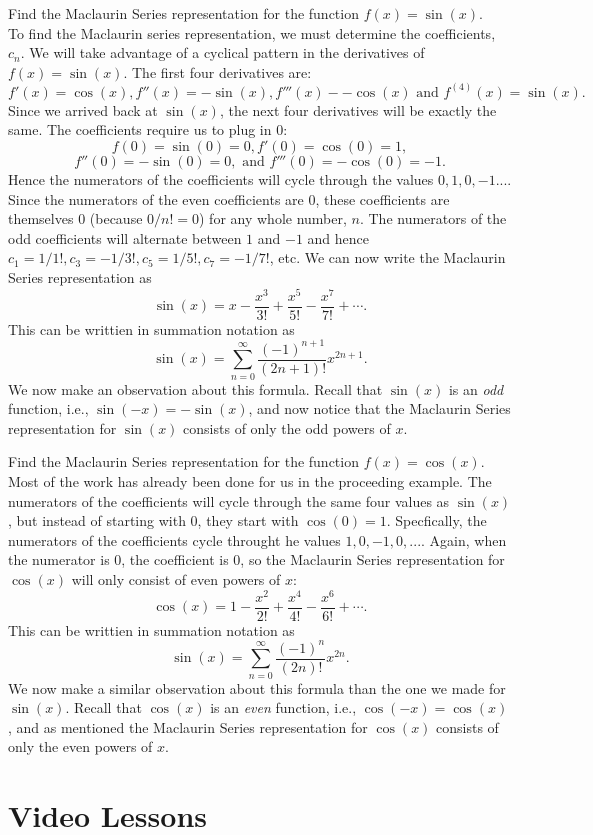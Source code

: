 \documentclass{ximera}
\begin{document}
\begin{example} Find the Maclaurin Series representation for the function $f(x) = \sin(x)$.\\
To find the Maclaurin series representation, we must determine the coefficients, $c_n$. 
We will take advantage of a cyclical pattern in the derivatives of $f(x) = \sin(x)$.
The first four derivatives are:
\[
f'(x) = \cos(x), f''(x) = -\sin(x), f'''(x) - -\cos(x) \text{ and } f^{(4)}(x) = \sin(x).
\]
Since we arrived back at $\sin(x)$, the next four derivatives will be exactly the same.
The coefficients require us to plug in 0:
\[
f(0) = \sin(0) = 0, f'(0) = \cos(0) = 1,
\]
\[
 f''(0) = -\sin(0) = 0, \text{ and } f'''(0) = -\cos(0) = -1.
\]
Hence the numerators of the coefficients will cycle through the values $0, 1, 0, -1...$.
Since the numerators of the even coefficients are 0, these coefficients are themselves 0 (because $0/n! = 0$) for any whole number, $n$.
The numerators of the odd coefficients will alternate between $1$ and $-1$ and hence $c_1 = 1/1!, c_3 = -1/3!, c_5 = 1/5!, c_7 = -1/7!$, etc.
We can now write the Maclaurin Series representation as
\[
\sin(x) = x - \frac{x^3}{3!} + \frac{x^5}{5!} - \frac{x^7}{7!} + \cdots.
\]
This can be writtien in summation notation as
\[
\sin(x) = \sum_{n=0}^\infty \frac{(-1)^{n+1}}{(2n+1)!}x^{2n+1}.
\]
We now make an observation about this formula. Recall that $\sin(x)$ is an \textit{odd} function, 
i.e., $\sin(-x) = -\sin(x)$, and now notice that the Maclaurin Series representation for $\sin(x)$ consists of only the 
odd powers of $x$.
\end{example}




\begin{example} Find the Maclaurin Series representation for the function $f(x) = \cos(x)$.\\
Most of the work has already been done for us in the proceeding example.  The numerators of the coefficients will cycle through the same
four values as $\sin(x)$, but instead of starting with 0, they start with $\cos(0) = 1$. 
Specfically, the numerators of the coefficients cycle throught he values $1, 0, -1, 0, ...$.  Again, when the numerator is 0, the coefficient is 0,
so the Maclaurin Series representation for $\cos(x)$ will only consist of even powers of $x$:
\[
\cos(x) = 1 - \frac{x^2}{2!} + \frac{x^4}{4!} - \frac{x^6}{6!} + \cdots.
\]
This can be writtien in summation notation as
\[
\sin(x) = \sum_{n=0}^\infty \frac{(-1)^n}{(2n)!}x^{2n}.
\]
We now make a similar observation about this formula than the one we made for $\sin(x)$. Recall that $\cos(x)$ is an \textit{even} function, 
i.e., $\cos(-x) = \cos(x)$, and as mentioned the Maclaurin Series representation for $\cos(x)$ consists of only the 
even powers of $x$.
\end{example}


\section{Video Lessons}


\begin{center}
\begin{foldable}
\end{foldable}
\end{center}
\end{document}

